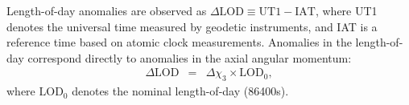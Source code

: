 Length-of-day anomalies are observed as $\Delta \text{LOD}  \equiv \text{UT1} - \text{IAT}$, where UT1 denotes the universal time measured by geodetic instruments, and IAT is a reference time based on atomic clock measurements.
Anomalies in the length-of-day correspond directly to anomalies in the axial angular momentum: 
\begin{eqnarray}
\Delta \text{LOD} &=& \Delta \chi_3 \times \text{LOD}_0 ,
\label{eq:X3_to_LOD}
\end{eqnarray}
where $\text{LOD}_0$ denotes the nominal length-of-day (86400s).  




